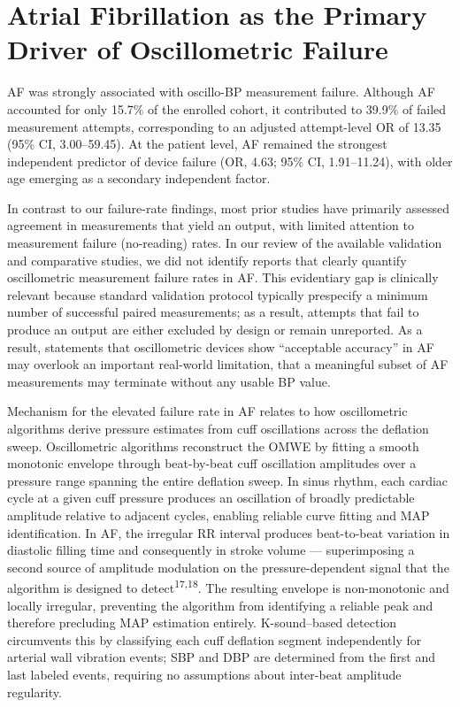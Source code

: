 \documentclass[
  12pt,
  letterpaper,
  openany,
  oneside]{book}
\begin{document}
\section{Atrial Fibrillation as the Primary Driver of Oscillometric
Failure}\label{atrial-fibrillation-as-the-primary-driver-of-oscillometric-failure}

AF was strongly associated with oscillo-BP measurement failure. Although
AF accounted for only 15.7\% of the enrolled cohort, it contributed to
39.9\% of failed measurement attempts, corresponding to an adjusted
attempt-level OR of 13.35 (95\% CI, 3.00--59.45). At the patient level,
AF remained the strongest independent predictor of device failure (OR,
4.63; 95\% CI, 1.91--11.24), with older age emerging as a secondary
independent factor.

In contrast to our failure-rate findings, most prior studies have
primarily assessed agreement in measurements that yield an output, with
limited attention to measurement failure (no-reading) rates. In our
review of the available validation and comparative studies, we did not
identify reports that clearly quantify oscillometric measurement failure
rates in AF. This evidentiary gap is clinically relevant because
standard validation protocol typically prespecify a minimum number of
successful paired measurements; as a result, attempts that fail to
produce an output are either excluded by design or remain unreported. As
a result, statements that oscillometric devices show ``acceptable
accuracy'' in AF may overlook an important real-world limitation, that a
meaningful subset of AF measurements may terminate without any usable BP
value.

Mechanism for the elevated failure rate in AF relates to how
oscillometric algorithms derive pressure estimates from cuff
oscillations across the deflation sweep. Oscillometric algorithms
reconstruct the OMWE by fitting a smooth monotonic envelope through
beat-by-beat cuff oscillation amplitudes over a pressure range spanning
the entire deflation sweep. In sinus rhythm, each cardiac cycle at a
given cuff pressure produces an oscillation of broadly predictable
amplitude relative to adjacent cycles, enabling reliable curve fitting
and MAP identification. In AF, the irregular RR interval produces
beat-to-beat variation in diastolic filling time and consequently in
stroke volume --- superimposing a second source of amplitude modulation
on the pressure-dependent signal that the algorithm is designed to
detect\textsuperscript{17,18}. The resulting envelope is non-monotonic
and locally irregular, preventing the algorithm from identifying a
reliable peak and therefore precluding MAP estimation entirely.
K-sound--based detection circumvents this by classifying each cuff
deflation segment independently for arterial wall vibration events; SBP
and DBP are determined from the first and last labeled events, requiring
no assumptions about inter-beat amplitude regularity.
\end{document}

